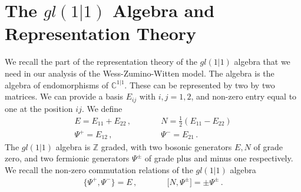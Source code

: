 \documentclass[12pt]{article}
\numberwithin{equation}{section}
\numberwithin{equation}{section}
\numberwithin{table}{section}\setlength{\multlinegap}{25pt}
\begin{document}
\appendix


\section{The $gl(1|1)$ Algebra and  Representation Theory}
\label{reps}
We recall the part of the representation theory of the $gl(1|1)$ algebra that we need
in our analysis of the Wess-Zumino-Witten model.
The algebra is the algebra of endomorphisms of $\mathbb{C}^{1|1}$. These can be represented by  two by two matrices.
We can provide a basis $E_{ij}$ with $i,j=1,2$, and non-zero entry equal to 
one at the position $ij$. We define
\begin{eqnarray}
E = E_{11}+E_{22} \, , & \qquad &
N = \frac{1}{2}(E_{11}-E_{22})
\nonumber \\
\Psi^+ = E_{12} \, , & \qquad &
\Psi^- = E_{21} \, .
\end{eqnarray}
The $gl(1|1)$ algebra is $\mathbb{Z}$ graded, with two bosonic
generators $E,N$ of grade zero, and two fermionic generators 
$\Psi^\pm$ of grade plus and minus one respectively.
We recall the non-zero commutation relations of the $gl(1|1)$ algebra
\begin{eqnarray}
\{ \Psi^+, \Psi^- \} = E \, , 
& \qquad &
{[} N , \Psi^\pm {]} = \pm \Psi^\pm \, .
\end{eqnarray}
\end{document}
